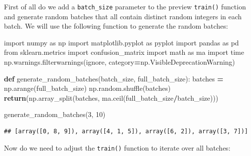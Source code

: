 \documentclass[
]{book}
\newenvironment{Shaded}{\begin{snugshade}}{\end{snugshade}}
\newcommand{\ControlFlowTok}[1]{\textcolor[rgb]{0.13,0.29,0.53}{\textbf{#1}}}
\newcommand{\DecValTok}[1]{\textcolor[rgb]{0.00,0.00,0.81}{#1}}
\newcommand{\ImportTok}[1]{#1}
\newcommand{\KeywordTok}[1]{\textcolor[rgb]{0.13,0.29,0.53}{\textbf{#1}}}
\newcommand{\NormalTok}[1]{#1}
\newcommand{\OperatorTok}[1]{\textcolor[rgb]{0.81,0.36,0.00}{\textbf{#1}}}
\newcommand{\StringTok}[1]{\textcolor[rgb]{0.31,0.60,0.02}{#1}}
\begin{document}
First of all do we add a \texttt{batch\_size} parameter to the preview \texttt{train()} function and generate random batches that all contain distinct random integers in each batch. We will use the following function to generate the random batches:

\begin{Shaded}
\begin{Highlighting}[]
\ImportTok{import}\NormalTok{ numpy }\ImportTok{as}\NormalTok{ np}
\ImportTok{import}\NormalTok{ matplotlib.pyplot }\ImportTok{as}\NormalTok{ pyplot}
\ImportTok{import}\NormalTok{ pandas }\ImportTok{as}\NormalTok{ pd}
\ImportTok{from}\NormalTok{ sklearn.metrics }\ImportTok{import}\NormalTok{ confusion\_matrix}
\ImportTok{import}\NormalTok{ math }\ImportTok{as}\NormalTok{ ma}
\ImportTok{import}\NormalTok{ time}
\NormalTok{np.warnings.filterwarnings(}\StringTok{\textquotesingle{}ignore\textquotesingle{}}\NormalTok{, category}\OperatorTok{=}\NormalTok{np.VisibleDeprecationWarning) }

\KeywordTok{def}\NormalTok{ generate\_random\_batches(batch\_size, full\_batch\_size):}
\NormalTok{  batches }\OperatorTok{=}\NormalTok{ np.arange(full\_batch\_size)}
\NormalTok{  np.random.shuffle(batches)}
  \ControlFlowTok{return}\NormalTok{(np.array\_split(batches, ma.ceil(full\_batch\_size}\OperatorTok{/}\NormalTok{batch\_size)))}

\NormalTok{generate\_random\_batches(}\DecValTok{3}\NormalTok{, }\DecValTok{10}\NormalTok{)}
\end{Highlighting}
\end{Shaded}

\begin{verbatim}
## [array([0, 8, 9]), array([4, 1, 5]), array([6, 2]), array([3, 7])]
\end{verbatim}

Now do we need to adjust the \texttt{train()} function to iterate over all batches:
\end{document}
